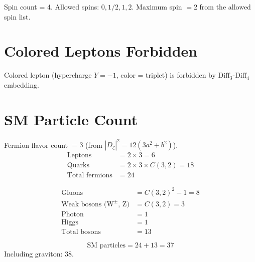 \begin{theorem}
\label{thm:particle_max_spin}
\leanok
Spin count = 4. Allowed spins: $0, 1/2, 1, 2$.
Maximum spin $= 2$ from the allowed spin list.
\end{theorem}

\section{Colored Leptons Forbidden}
\label{sec:particle_colored_leptons}

\begin{theorem}
\label{thm:particle_colored_lepton}
\leanok
Colored lepton (hypercharge $Y = -1$, color = triplet) is forbidden by $\mathrm{Diff}_3$-$\mathrm{Diff}_4$ embedding.
\end{theorem}

\section{SM Particle Count}
\label{sec:particle_count}

\begin{theorem}
\label{thm:particle_fermion_count}
\leanok
Fermion flavor count $= 3$ (from $|D_\zeta|^2 = 12(3a^2 + b^2)$).
\begin{align}
\text{Leptons} &= 2 \times 3 = 6 \\
\text{Quarks} &= 2 \times 3 \times C(3,2) = 18 \\
\text{Total fermions} &= 24
\end{align}
\end{theorem}

\begin{theorem}
\label{thm:particle_boson_count}
\leanok
\begin{align}
\text{Gluons} &= C(3,2)^2 - 1 = 8 \\
\text{Weak bosons (W}^\pm\text{, Z)} &= C(3,2) = 3 \\
\text{Photon} &= 1 \\
\text{Higgs} &= 1 \\
\text{Total bosons} &= 13
\end{align}
\end{theorem}

\begin{theorem}
\label{thm:particle_sm_count}
\leanok
\[
\text{SM particles} = 24 + 13 = 37
\]
Including graviton: 38.
\end{theorem}

